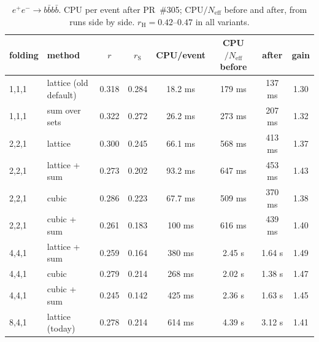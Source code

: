 \documentclass[11pt,a4paper]{article}
\newcommand{\rS}{r_{\mathrm S}}
\newcommand{\rH}{r_{\mathrm H}}
\newcommand{\Neff}{N_{\mathrm{eff}}}
\begin{document}
\begin{table}[p]
\centering\small
\begin{tabular}{llcccccc}
\toprule
folding & method & $r$ & $\rS$ & CPU/event & CPU$/\Neff$ before & after & gain\\
\midrule
1,1,1 & lattice (old default) & 0.318 & 0.284 & 18.2 ms & 179 ms & 137 ms & 1.30\\
1,1,1 & sum over sets & 0.322 & 0.272 & 26.2 ms & 273 ms & 207 ms & 1.32\\
2,2,1 & lattice & 0.300 & 0.245 & 66.1 ms & 568 ms & 413 ms & 1.37\\
2,2,1 & lattice + sum & 0.273 & 0.202 & 93.2 ms & 647 ms & 453 ms & 1.43\\
2,2,1 & cubic & 0.286 & 0.223 & 67.7 ms & 509 ms & 370 ms & 1.38\\
2,2,1 & cubic + sum & 0.261 & 0.183 & 100 ms & 616 ms & 439 ms & 1.40\\
4,4,1 & lattice + sum & 0.259 & 0.164 & 380 ms & 2.45 s & 1.64 s & 1.49\\
4,4,1 & cubic & 0.279 & 0.214 & 268 ms & 2.02 s & 1.38 s & 1.47\\
4,4,1 & cubic + sum & 0.245 & 0.142 & 425 ms & 2.36 s & 1.63 s & 1.45\\
8,4,1 & lattice (today) & 0.278 & 0.214 & 614 ms & 4.39 s & 3.12 s & 1.41\\
\bottomrule
\end{tabular}
\caption{$e^+e^-\to b\bar b b\bar b$. CPU per event after PR~\#305; CPU$/\Neff$ before and after,
from runs side by side. $\rH=0.42$--$0.47$ in all variants.}
\label{tab:ee4b}
\end{table}
\end{document}
